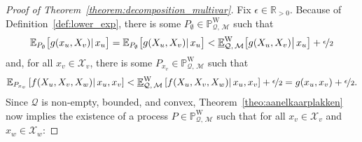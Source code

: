\documentclass[10pt,a4paper]{paper}
\theoremstyle{definition}
\newcommand{\reals}{\mathbb{R}}
\newcommand{\realspos}{\reals_{>0}}
\newcommand{\states}{\mathcal{X}}
\newcommand{\processes}{\mathbb{P}}
\newcommand{\wprocesses}{\processes^{\mathrm{W}}}
\newcommand{\rateset}{\mathcal{Q}}
\newcommand{\norm}[1]{\left\lVert #1 \right\rVert}
\newcommand{\abs}[1]{\left\vert #1 \right\vert}
\newcommand{\coloneqq}{:\!=}
\begin{document}
\begin{proof}[Proof of Theorem~\ref{theorem:decomposition_multivar}]
Fix $\epsilon\in\realspos$.
Because of Definition~\ref{def:lower_exp}, there is some $P_\emptyset\in\wprocesses_{\rateset,\,\mathcal{M}}$ such that
\begin{equation}\label{eq:theorem:decomposition_multivar:firsthalfprob}
\mathbb{E}_{P_\emptyset}\bigl[g(x_u,X_v)\vert\,x_u\bigr]
=\mathbb{E}_{P_\emptyset}\bigl[g(X_u,X_v)\vert\,x_u\bigr] < \underline{\mathbb{E}}^{\mathrm{W}}_{\rateset,\,\mathcal{M}}\bigl[g(X_u,X_v)\big\vert\,x_u\bigr]
+\nicefrac{\epsilon}{2}
\end{equation}
and, for all $x_{v}\in\states_v$, there is some $P_{x_v}\in\wprocesses_{\rateset,\,\mathcal{M}}$ such that
\begin{equation}\label{eq:theorem:decomposition_multivar:secondhalfprob}
\mathbb{E}_{P_{x_v}}\left[f(X_u,X_v,X_w)\vert\,x_u,x_v\right] < \underline{\mathbb{E}}^{\mathrm{W}}_{\rateset,\,\mathcal{M}}\left[f(X_u,X_v,X_w)\vert\,x_u,x_v\right]+\nicefrac{\epsilon}{2}=g(x_u,x_v)+\nicefrac{\epsilon}{2}.
\end{equation}
Since $\rateset$ is non-empty, bounded, and convex, Theorem~\ref{theo:aanelkaarplakken} now implies the existence of a process $P\in\wprocesses_{\rateset,\,\mathcal{M}}$ such that for all $x_v\in\states_v$ and $x_w\in\states_w$:

\end{proof}
\end{document}
